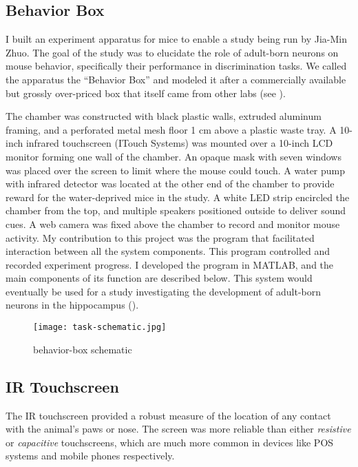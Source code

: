 \documentclass[../main.tex]{subfiles}
\begin{document}
\subsection{Behavior Box}\label{sec:behavior-box}

I built an experiment apparatus for mice to enable a study being run by Jia-Min Zhuo.
The goal of the study was to elucidate the role of adult-born neurons on mouse behavior, specifically their performance in discrimination tasks.
We called the apparatus the ``Behavior Box'' and modeled it after a commercially available but grossly over-priced box that itself came from other labs (see \cite{McLelland2015}).

The chamber was constructed with black plastic walls, extruded aluminum framing, and a perforated metal mesh floor 1 cm above a plastic waste tray.
A 10-inch infrared touchscreen (ITouch Systems) was mounted over a 10-inch LCD monitor forming one wall of the chamber.
An opaque mask with seven windows was placed over the screen to limit where the mouse could touch.
A water pump with infrared detector was located at the other end of the chamber to provide reward for the water-deprived mice in the study.
A white LED strip encircled the chamber from the top, and multiple speakers positioned outside to deliver sound cues.
A web camera was fixed above the chamber to record and monitor mouse activity.
My contribution to this project was the program that facilitated interaction between all the system components.
This program controlled and recorded experiment progress.
I developed the program in MATLAB, and the main components of its function are described below.
This system would eventually be used for a study investigating the development of adult-born neurons in the hippocampus (\cite{Zhuo_2016}).

\begin{figure}
	\texttt{[image: task-schematic.jpg]}
	\caption{behavior-box schematic}
	\label{fig:behaivorbox schematic}
\end{figure}

\subsection{IR Touchscreen}\label{sec:ir-touchscreen}

The IR touchscreen provided a robust measure of the location of any contact with the animal's paws or nose.
The screen was more reliable than either \emph{resistive} or \emph{capacitive} touchscreens, which are much more common in devices like POS systems and mobile phones respectively.
\end{document}
